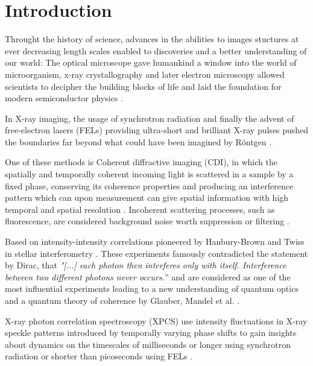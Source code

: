 \chapter{Introduction}
Throught the history of science, advances in the abilities to images stuctures at ever decreasing length scales enabled to discoveries and a better understanding of our world:
The optical microscope gave humankind a window into the world of microorganism, x-ray crystallography and later electron microscopy allowed scientists to decipher the building blocks of life and laid the foundation for modern semiconductor physics \cite{hooke1665,laue1915,ruska1939,watson1953,hovmoeller1984}.

In X-ray imaging, the usage of synchrotron radiation and finally the advent of free-electron lasers (FELs) providing ultra-short and brilliant X-ray pulses pushed the boundaries far beyond what could have been imagined by Röntgen \cite{cloetens1996,emma2010}. 

One of these methods is Coherent diffractive imaging (CDI), in which the spatially and temporally coherent incoming light is scattered in a sample by a fixed phase, conserving its coherence properties and producing an interference pattern which can upon measurement can give spatial information with high temporal and spatial resolution \cite{seibert2011,bostedt2010,barke2015}. Incoherent scattering processes, such as fluorescence, are considered background noise worth suppression or filtering \cite{schultz2013chapter7}. 

Based on intensity-intensity correlations pioneered by Hanbury-Brown and Twiss in stellar interferometry \cite{hanbury1956}. These experiments famously contradicted the statement by Dirac, that \textit{"[...] each photon then interferes only with itself. Interference between two different photons never occurs.}” \cite{dirac1958} and are considered as one of the most influential experiments leading to a new understanding of quantum optics and a quantum theory of coherence by Glauber, Mandel et al. \cite{glauber1963,mandel1959, hong1987,glauber2006} . 







 X-ray photon correlation spectroscopy (XPCS) use intensity fluctuations in X-ray speckle patterns introduced by  temporally varying phase shifts to gain insights about dynamics on the timescales of milliseconds or longer using synchrotron radiation or shorter than picoseconds using FELs \cite{lehmkuhler2021,grubel2007}.
 
